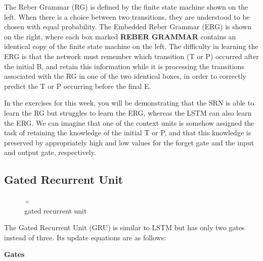 \documentclass[11pt]{article}
\begin{document}
The Reber Grammar (RG) is defined by the finite state machine shown on the left.
When there is a choice between two transitions, they are understood to be
chosen with equal probability.
The Embedded Reber Grammar (ERG) is shown on the right, where each box marked
\textbf{REBER GRAMMAR} contains an identical copy of the finite state machine
on the left.
The difficulty in learning the ERG is that the network must remember which
transition (T or P)  occurred after the initial B, and retain this information
while it is processing the transitions associated with the RG in one of the two
identical boxes, in order to correctly predict the T or P occurring before the
final E.

In the exercises for this week, you will be demonstrating that the SRN is able
to learn the RG but struggles to learn the ERG, whereas the LSTM can also learn
the ERG. We can imagine that one of the context units is somehow assigned the
task of retaining the knowledge of the initial T or P, and that this knowledge
is preserved by appropriately high and low values for the forget gate and the
input and output gate, respectively.

\subsection{Gated Recurrent Unit}\label{subsec:gated-recurrent-unit}

\begin{figure}[h]
    \centering
    \includegraphics[height=6,width=12]{../out/images/gated-recurrent-unit}
    \caption[gated recurrent unit]{gated recurrent unit}
    \label{fig: gated recurrent unit}
\end{figure}

The Gated Recurrent Unit (GRU) is similar to LSTM but has only two gates
instead of three.
Its update equations are as follows:

\textbf{Gates}
\end{document}
